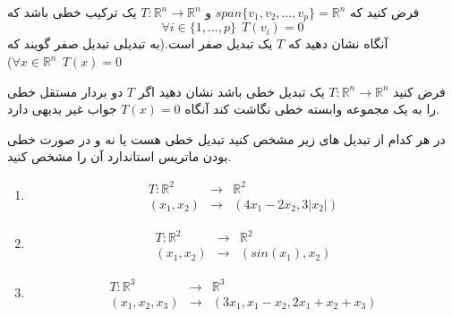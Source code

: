 \documentclass{article}
\begin{document}
 فرض کنید که 
 $span\{v_1,v_2,\ldots,v_p\}=\mathbb{R}^n$
 و 
 $T:\mathbb{R}^n\longrightarrow \mathbb{R}^n$
یک ترکیب خطی باشد که 
$$\forall i \in\{1,\ldots,p \}\ \ T(v_i)=0 $$
آنگاه نشان دهید که
$T$
 یک تبدیل صفر است.(به تبدیلی تبدیل صفر گویند که 
$\forall x\in \mathbb{R}^n \ \ T(x)=0$)


فرض کنید 
$T:\mathbb{R}^n\longrightarrow \mathbb{R}^n$
یک تبدیل خطی باشد نشان دهید اگر 
$T$	
دو بردار مستقل خطی را به یک مجموعه وابسته خطی نگاشت کند آنگاه 
$T(x)=0$
جواب غیر بدیهی دارد.

در هر کدام از تبدیل های زیر مشخص کنید تبدیل خطی هست یا نه و در صورت خطی بودن ماتریس استاندارد آن را مشخص کنید.
\begin{enumerate}
	\item
	{\setlength\arraycolsep{0.1em}
	\begin{eqnarray*}
	T:\mathbb{R}^2&\longrightarrow&\mathbb{R}^2\\
	(x_1,x_2)&\longrightarrow&(4x_1-2x_2,3|x_2|)
	\end{eqnarray*}}
\item 
	{\setlength\arraycolsep{0.1em}
	\begin{eqnarray*}
		T:\mathbb{R}^2&\longrightarrow&\mathbb{R}^2\\
		(x_1,x_2)&\longrightarrow&(sin(x_1),x_2)
\end{eqnarray*}}
\item
{\setlength\arraycolsep{0.1em}
	\begin{eqnarray*}
		T:\mathbb{R}^3&\longrightarrow&\mathbb{R}^3\\
		(x_1,x_2,x_3)&\longrightarrow&(3x_1,x_1-x_2,2x_1+x_2+x_3)
\end{eqnarray*}}

\end{enumerate}	
\end{document}
